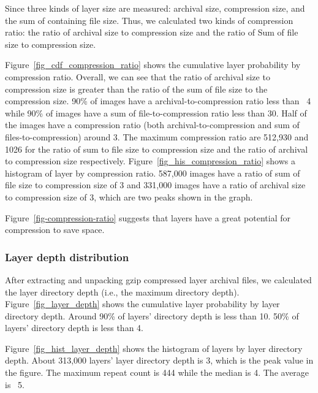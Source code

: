 Since three kinds of layer size are measured: archival size, compression size, and the sum of containing file size. Thus, we calculated two kinds of compression ratio: the ratio of archival size to compression size and the ratio of Sum of file size to compression size. 

Figure~\ref{fig_cdf_compression_ratio} shows the cumulative layer probability by compression ratio. Overall, we can see that the ratio of archival size to compression size is greater than the ratio of the sum of file size to the compression size. 90\% of images have a archival-to-compression ratio less than ~4 while 90\% of images have a sum of file-to-compression ratio less than 30. Half of the images have a compression ratio (both archival-to-compression and sum of files-to-compression) around 3. The maximum compression ratio are 512,930 and 1026 for the ratio of sum to file size to compression size and the ratio of archival to compression size respectively.
Figure~\ref{fig_his_compression_ratio} shows a histogram of layer by compression ratio. 587,000 images have a ratio of sum of file size to compression size of 3 and 331,000 images have a ratio of archival size to compression size of 3, which are two peaks shown in the graph.

Figure~\ref{fig-compression-ratio} suggests that layers have a great potential for compression to save space.

\subsubsection{Layer depth distribution}

After extracting and unpacking gzip compressed layer archival files, we calculated the layer directory depth (i.e., the maximum directory depth). 
Figure~\ref{fig_layer_depth} shows the cumulative layer probability by layer directory depth. Around 90\% of layers' directory depth is less than 10. 50\% of layers' directory depth is less than 4. 

Figure~\ref{fig_hist_layer_depth} shows the histogram of layers by layer directory depth. About 313,000 layers' layer directory depth is 3, which is the peak value in the figure. The maximum repeat count is 444 while the median is 4. The average is ~5.

